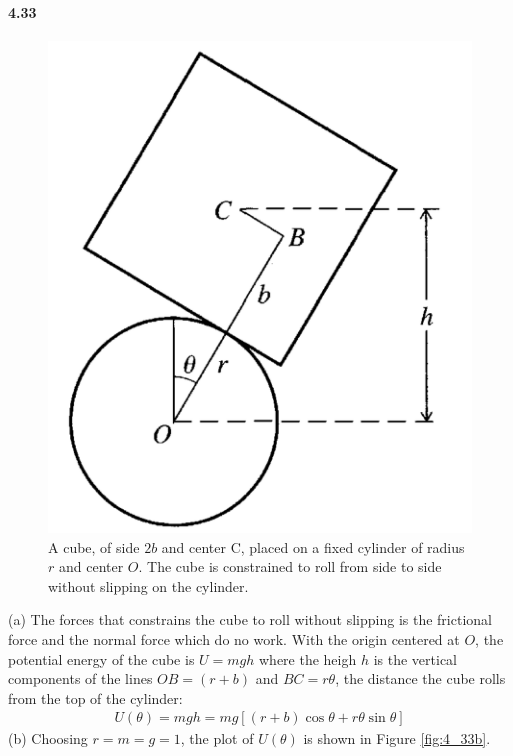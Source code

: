 \documentclass[../problems.tex]{subfiles}
\begin{document}
\paragraph{4.33}
\begin{figure} [ht]
    \centering
    \includegraphics[scale=0.2]{../images/fig4_33.png}
    \captionsetup{width=0.8\textwidth}
    \caption{A cube, of side $2b$ and center C, placed on a fixed cylinder of radius $r$ and center
    $O$. The cube is constrained to roll from side to side without slipping on the cylinder.}
    \label{fig:4_33}
\end{figure}
(a) The forces that constrains the cube to roll without slipping is the frictional force and the
normal force which do no work. With the origin centered at $O$, the potential energy of the cube is
$U = mgh$ where the heigh $h$ is the vertical components of the lines $OB = (r + b)$ and
$BC = r\theta$, the distance the cube rolls from the top of the cylinder:
\begin{align*} \tag{4.59}
    U(\theta) = mgh = mg[(r + b)\cos{\theta} + r\theta\sin\theta]
\end{align*}
(b)
Choosing $r = m = g = 1$, the plot of $U(\theta)$ is shown in Figure \ref{fig:4_33b}.
\end{document}

